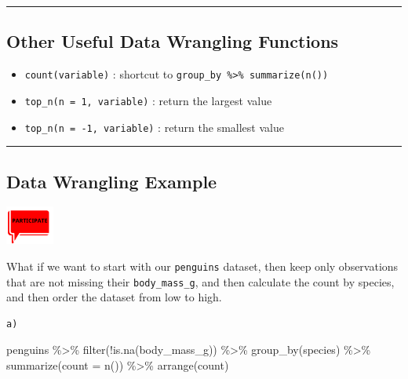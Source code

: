 \documentclass[
  letterpaper,
  DIV=11,
  numbers=noendperiod]{scrreprt}
\newenvironment{Shaded}{\begin{snugshade}}{\end{snugshade}}
\newcommand{\AttributeTok}[1]{\textcolor[rgb]{0.40,0.45,0.13}{#1}}
\newcommand{\FunctionTok}[1]{\textcolor[rgb]{0.28,0.35,0.67}{#1}}
\newcommand{\NormalTok}[1]{\textcolor[rgb]{0.00,0.23,0.31}{#1}}
\newcommand{\SpecialCharTok}[1]{\textcolor[rgb]{0.37,0.37,0.37}{#1}}
\providecommand{\tightlist}{%
  \setlength{\itemsep}{0pt}\setlength{\parskip}{0pt}}\usepackage{longtable,booktabs,array}
\begin{document}
\begin{center}\rule{0.5\linewidth}{0.5pt}\end{center}

\hypertarget{other-useful-data-wrangling-functions}{%
\subsection*{Other Useful Data Wrangling
Functions}\label{other-useful-data-wrangling-functions}}

\begin{itemize}
\tightlist
\item
  \texttt{count(variable)} : shortcut to
  \texttt{group\_by\ \%\textgreater{}\%\ summarize(n())}
\item
  \texttt{top\_n(n\ =\ 1,\ variable)} : return the largest value
\item
  \texttt{top\_n(n\ =\ -1,\ variable)} : return the smallest value
\end{itemize}

\begin{center}\rule{0.5\linewidth}{0.5pt}\end{center}

\hypertarget{data-wrangling-example}{%
\subsection*{Data Wrangling Example}\label{data-wrangling-example}}

\includegraphics[width=\textwidth,height=0.5in]{images/images_lecture/participate_icon.png}

What if we want to start with our \texttt{penguins} dataset, then keep
only observations that are not missing their \texttt{body\_mass\_g}, and
then calculate the count by species, and then order the dataset from low
to high.

\begin{verbatim}
a)
\end{verbatim}

\begin{Shaded}
\begin{Highlighting}[]
\NormalTok{penguins }\SpecialCharTok{\%\textgreater{}\%} 
  \FunctionTok{filter}\NormalTok{(}\SpecialCharTok{!}\FunctionTok{is.na}\NormalTok{(body\_mass\_g)) }\SpecialCharTok{\%\textgreater{}\%} 
  \FunctionTok{group\_by}\NormalTok{(species) }\SpecialCharTok{\%\textgreater{}\%} 
  \FunctionTok{summarize}\NormalTok{(}\AttributeTok{count =} \FunctionTok{n}\NormalTok{()) }\SpecialCharTok{\%\textgreater{}\%} 
  \FunctionTok{arrange}\NormalTok{(count)}
\end{Highlighting}
\end{Shaded}
\end{document}
